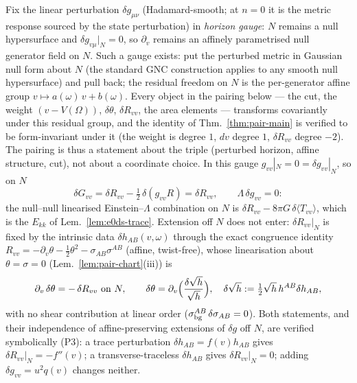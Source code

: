 \begin{remark}
\label{rem:pair-gauge}
Fix the linear perturbation $\delta g_{\mu\nu}$ (Hadamard-smooth; at
$n{=}0$ it is the metric response sourced by the state perturbation)
in \emph{horizon gauge}: $N$ remains a null hypersurface and
$\delta g_{v\mu}|_{N}=0$, so $\partial_{v}$ remains an affinely
parametrised null generator field on $N$. Such a gauge exists: put the
perturbed metric in Gaussian null form about $N$ (the standard GNC
construction applies to any smooth null hypersurface) and pull back;
the residual freedom on $N$ is the per-generator affine group
$v\mapsto a(\omega)\,v+b(\omega)$. Every object in the pairing below
--- the cut, the weight $(v-V(\Omega))$, $\delta\theta$,
$\delta R_{vv}$, the area elements --- transforms covariantly under
this residual group, and the identity of Thm.~\ref{thm:pair-main} is
verified to be form-invariant under it (the weight is degree $1$, $dv$
degree $1$, $\delta R_{vv}$ degree $-2$). The pairing is thus a
statement about the triple (perturbed horizon, affine structure, cut),
not about a coordinate choice. In this gauge $g_{vv}|_{N}=0=\delta
g_{vv}|_{N}$, so on $N$
\[
\delta G_{vv}=\delta R_{vv}
-\tfrac12\,\delta(g_{vv}R)=\delta R_{vv},
\qquad
\Lambda\,\delta g_{vv}=0 :
\]
the null--null linearised Einstein--$\Lambda$ combination on $N$ is
$\delta R_{vv}-8\pi G\,\delta\langle T_{vv}\rangle$, which is the
$E_{kk}$ of Lem.~\ref{lem:e0ds-trace}. Extension off $N$ does not
enter: $\delta R_{vv}|_{N}$ is fixed by the intrinsic data
$\delta h_{AB}(v,\omega)$ through the exact congruence identity
$R_{vv}=-\partial_{v}\theta-\tfrac12\theta^{2}
-\sigma_{AB}\sigma^{AB}$ (affine, twist-free), whose linearisation
about $\theta=\sigma=0$ (Lem.~\ref{lem:pair-chart}(iii)) is
\[
\partial_{v}\,\delta\theta=-\,\delta R_{vv}\ \text{on }N,
\qquad
\delta\theta=\partial_{v}\Bigl(\frac{\delta\sqrt h}{\sqrt h}\Bigr),
\quad
\delta\sqrt h:=\tfrac12\sqrt h\,h^{AB}\delta h_{AB},
\]
with no shear contribution at linear order ($\sigma^{AB}_{\rm bg}\,
\delta\sigma_{AB}=0$). Both statements, and their independence of
affine-preserving extensions of $\delta g$ off $N$, are verified
symbolically (P3): a trace perturbation $\delta h_{AB}=f(v)h_{AB}$
gives $\delta R_{vv}|_{N}=-f''(v)$; a transverse-traceless
$\delta h_{AB}$ gives $\delta R_{vv}|_{N}=0$; adding
$\delta g_{vv}=u^{2}q(v)$ changes neither.
\end{remark}

